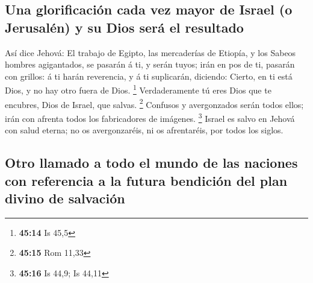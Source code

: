 \hypertarget{una-glorificaciuxf3n-cada-vez-mayor-de-israel-o-jerusaluxe9n-y-su-dios-seruxe1-el-resultado}{%
\subsection{Una glorificación cada vez mayor de Israel (o Jerusalén) y
su Dios será el
resultado}\label{una-glorificaciuxf3n-cada-vez-mayor-de-israel-o-jerusaluxe9n-y-su-dios-seruxe1-el-resultado}}

 Así dice Jehová: El trabajo de Egipto, las mercaderías
de Etiopía, y los Sabeos hombres agigantados, se pasarán á ti, y serán
tuyos; irán en pos de ti, pasarán con grillos: á ti harán reverencia, y
á ti suplicarán, diciendo: Cierto, en ti está Dios, y no hay otro fuera
de Dios. \footnote{\textbf{45:14} Is 45,5} 
Verdaderamente tú eres Dios que te encubres, Dios de Israel, que salvas.
\footnote{\textbf{45:15} Rom 11,33}  Confusos y
avergonzados serán todos ellos; irán con afrenta todos los fabricadores
de imágenes. \footnote{\textbf{45:16} Is 44,9; Is 44,11} 
Israel es salvo en Jehová con salud eterna; no os avergonzaréis, ni os
afrentaréis, por todos los siglos.

\hypertarget{otro-llamado-a-todo-el-mundo-de-las-naciones-con-referencia-a-la-futura-bendiciuxf3n-del-plan-divino-de-salvaciuxf3n}{%
\subsection{Otro llamado a todo el mundo de las naciones con referencia
a la futura bendición del plan divino de
salvación}\label{otro-llamado-a-todo-el-mundo-de-las-naciones-con-referencia-a-la-futura-bendiciuxf3n-del-plan-divino-de-salvaciuxf3n}}

